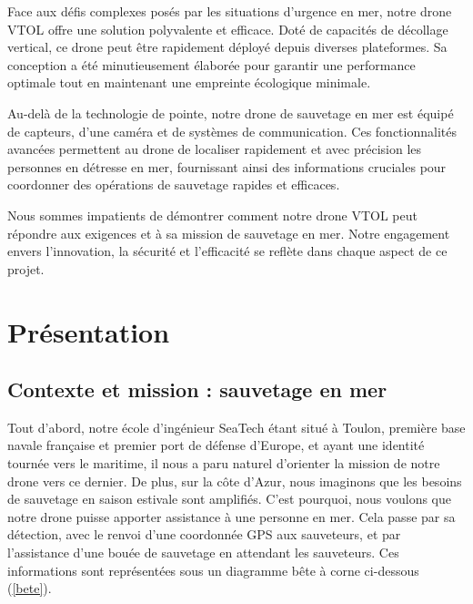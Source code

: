\documentclass[a4paper,12pt,french]{report}
\begin{document}
Face aux défis complexes posés par les situations d'urgence en mer, notre drone VTOL offre une solution polyvalente et efficace. Doté de capacités de décollage vertical, ce drone peut être rapidement déployé depuis diverses plateformes. Sa conception a été minutieusement élaborée pour garantir une performance optimale tout en maintenant une empreinte écologique minimale.\newline

Au-delà de la technologie de pointe, notre drone de sauvetage en mer est équipé de capteurs, d’une caméra et de systèmes de communication. Ces fonctionnalités avancées permettent au drone de localiser rapidement et avec précision les personnes en détresse en mer, fournissant ainsi des informations cruciales pour coordonner des opérations de sauvetage rapides et efficaces.\newline

Nous sommes impatients de démontrer comment notre drone VTOL peut répondre aux exigences et à sa mission de sauvetage en mer. Notre engagement envers l'innovation, la sécurité et l'efficacité se reflète dans chaque aspect de ce projet.


\chapter{Présentation}

\section{Contexte et mission : sauvetage en mer}

Tout d'abord, notre école d'ingénieur SeaTech étant situé à Toulon, première base navale française et premier port de défense d'Europe, et ayant une identité tournée vers le maritime, il nous a paru naturel d'orienter la mission de notre drone vers ce dernier. De plus, sur la côte d'Azur, nous imaginons que les besoins de sauvetage en saison estivale sont amplifiés. C'est pourquoi, nous voulons que notre drone puisse apporter assistance à une personne en mer. Cela passe par sa détection, avec le renvoi d'une coordonnée GPS aux sauveteurs, et par l'assistance d'une bouée de sauvetage en attendant les sauveteurs. Ces informations sont représentées sous un diagramme bête à corne ci-dessous (\ref{bete}).
\bigskip
\end{document}
